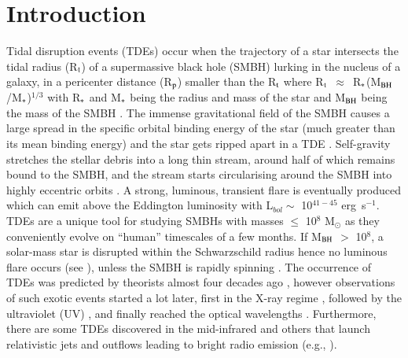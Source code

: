 \documentclass[structabstract]{aa}
\begin{document}
   \maketitle
%

\section{Introduction} \label{sec:intro}

Tidal disruption events (TDEs) occur when the trajectory of a star intersects the tidal radius (R$_{\rm t}$) of a supermassive black hole (SMBH) lurking in the nucleus of a galaxy, in a pericenter distance (R$_{\rm p}$) smaller than the R$_{\rm t}$ where R$_{\rm t}$~$\approx$~R$_{\rm *}$(M$_{\rm BH}$/M$_{\rm *}$)$^{1/3}$ with R$_{\rm *}$ and M$_{\rm *}$ being the radius and mass of the star and M$_{\rm BH}$ being the mass of the SMBH \citep{Hills1975}. The immense gravitational field of the SMBH causes a large spread in the specific orbital binding energy of the star (much greater than its mean binding energy) and the star gets ripped apart in a TDE \citep{Rees1988}. Self-gravity stretches the stellar debris into a long thin stream, around half of which remains bound to the SMBH, and the stream starts circularising around the SMBH into highly eccentric orbits \citep{Rees1988,Evans1989}. A strong, luminous, transient flare is eventually produced \citep{Lacy1982,Rees1988,Evans1989,Phinney1989} which can emit above the Eddington luminosity \citep{Strubbe2009,Lodato2011} with L$_{bol} \sim$ 10$^{41-45}$ erg~s$^{-1}$. TDEs are a unique tool for studying SMBHs with masses $\leq$ 10$^{8}$ M$_\odot$ as they conveniently evolve on ``human'' timescales of a few months. If M$_{\rm BH}$ $>$ 10$^{8}$, a solar-mass star is disrupted within the Schwarzschild radius hence no luminous flare occurs (see \citealt{Kesden2012}), unless the SMBH is rapidly spinning \citep{Leloudas2016}. The occurrence of TDEs was predicted by theorists almost four decades ago \citep{Hills1975}, however observations of such exotic events started a lot later, first in the X-ray regime \citep{Komossa1999}, followed by the ultraviolet (UV) \citep{Gezari2006}, and finally reached the optical wavelengths \citep{Gezari2012}. Furthermore, there are some TDEs discovered in the mid-infrared \citep{Mattila2018} and others that launch relativistic jets and outflows leading to bright radio emission (e.g., \citealt{Zauderer2011,VanVelzen2016,Alexander}). 
\end{document}
